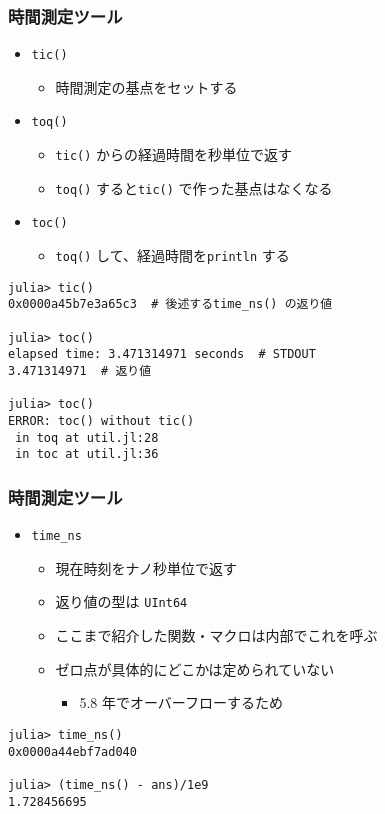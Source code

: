 \begin{frame}[containsverbatim]
  \frametitle{時間測定ツール}
  \begin{itemize}
    \item \verb|tic()|
      \begin{itemize}
        \item 時間測定の基点をセットする
      \end{itemize}
    \item \verb|toq()|
      \begin{itemize}
        \item \verb|tic()| からの経過時間を秒単位で返す
        \item \verb|toq()| すると\verb|tic()| で作った基点はなくなる
      \end{itemize}
    \item \verb|toc()|
      \begin{itemize}
        \item \verb|toq()| して、経過時間を\verb|println| する
      \end{itemize}
  \end{itemize}
  \begin{lstlisting}
julia> tic()
0x0000a45b7e3a65c3  # 後述するtime_ns() の返り値

julia> toc()
elapsed time: 3.471314971 seconds  # STDOUT
3.471314971  # 返り値

julia> toc()
ERROR: toc() without tic()
 in toq at util.jl:28
 in toc at util.jl:36
  \end{lstlisting}
\end{frame}

\begin{frame}[containsverbatim]
  \frametitle{時間測定ツール}
  \begin{itemize}
    \item \verb|time_ns|
      \begin{itemize}
        \item 現在時刻をナノ秒単位で返す
        \item 返り値の型は \verb|UInt64|
        \item ここまで紹介した関数・マクロは内部でこれを呼ぶ
        \item ゼロ点が具体的にどこかは定められていない
          \begin{itemize}
            \item 5.8 年でオーバーフローするため
          \end{itemize}
      \end{itemize}
  \end{itemize}
  \begin{lstlisting}
julia> time_ns()
0x0000a44ebf7ad040

julia> (time_ns() - ans)/1e9
1.728456695
\end{lstlisting}
\end{frame}

